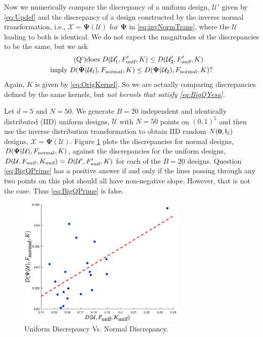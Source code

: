 \documentclass[graybox]{svmult}
\newcommand{\vPsi}{\boldsymbol{\Psi}}
\newcommand{\Udes}{\mathcal{U}}
\newcommand{\Xdes}{\mathcal{X}}
\newcommand{\unif}{\textup{unif}}
\newcommand{\normal}{\textup{normal}}
\begin{document}
Now we numerically compare the discrepancy of a uniform design, $\Udes'$ given by \eqref{eq:Updef} and the discrepancy of a design constructed by the inverse normal transformation, i.e.,  $\Xdes = \vPsi(\Udes)$ for $\vPsi$ in \eqref{eq:invNormTrans}, where the $\Udes$ leading to both is identical.  We do not expect the magnitudes of the discrepancies to be the same, but we ask
\begin{multline} \tag{Q'} \label{eq:BigQPrime}
    \text{does } D(\Udes'_1,F'_\unif, K)\leq D(\Udes_2',F_\unif', K) \\
    \text{imply }
     D(\vPsi(\Udes_1),F_\normal, K)\leq D(\vPsi(\Udes_2),F_\normal, K)?
\end{multline}
Again, $K$ is given by \eqref{eq:OrigKernel}.  So we are actually comparing discrepancies defined by the same kernels, but \emph{not kernels that satisfy \eqref{eq:BigQYesa}}.

Let $d=5$ and $N=50$. 
We generate $B=20$ independent and identically distributed (IID) uniform designs, $\Udes$ with $N=50$ points on $(0,1)^5$ and then use the inverse distribution transformation to obtain IID random $N({\bf 0}, {\mathsf I}_5)$ designs, $\Xdes = \vPsi(\Udes)$. 
Figure \ref{fig:UniVsNormDisc} plots the discrepancies for normal designs, $D(\vPsi(\Udes),F_\normal, K)$,  against the discrepancies for the uniform designs, $D(\Udes,F_\unif,K_\unif) = D(\Udes',F_\unif',K)$ for each of the $B=20$ designs. 
Question \eqref{eq:BigQPrime} has a positive answer if and only if the lines passing through any two points on this plot should all have non-negative slope.  However, that is not the case.  Thus \eqref{eq:BigQPrime} is false.

\begin{figure}[ht]
\begin{center}
\includegraphics[width=8cm]{code/d5n50.eps}
\caption{Uniform Discrepancy Vs. Normal Discrepancy. \label{fig:UniVsNormDisc}}
\end{center}
\end{figure}
\end{document}
